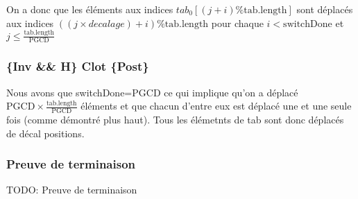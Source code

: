 On a donc que les éléments aux indices
$tab_{0}[(j+i)\%\mathrm{tab.length}]$ sont déplacés aux indices
$((j\times decalage) + i) \% \mathrm{tab.length}$ pour chaque $i <
\mathrm{switchDone}$
et $j \leq \frac{\mathrm{tab.length}}{\mathrm{PGCD}}$

\subsubsection*{\{Inv \&\& H\} Clot \{Post\}}

 Nous avons que switchDone=PGCD ce qui implique qu'on a déplacé
$\mathrm{PGCD}\times \frac{\mathrm{tab.length}}{\mathrm{PGCD}}$ éléments et
que chacun d'entre eux est déplacé une et une seule fois (comme démontré
plus haut). Tous les élémetnts de tab sont donc déplacés de décal positions.

\subsubsection*{Preuve de terminaison}
TODO: Preuve de terminaison
